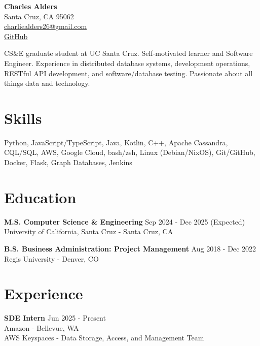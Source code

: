 \documentclass[a4paper,10pt]{article}
\begin{document}
\begin{center}
  {\LARGE \textbf{Charles Alders}} \\
  Santa Cruz, CA 95062 \\
  \href{mailto:charliealders26@gmail.com}{charliealders26@gmail.com} \\
  \href{https://github.com/char26}{GitHub}
\end{center}

\vspace{0.5cm}

\begin{flushleft}
  CS\&E graduate student at UC Santa Cruz. Self-motivated learner and Software Engineer. Experience in distributed database systems, development operations, RESTful API development, and software/database testing. Passionate about all things data and technology.
\end{flushleft}

\section*{Skills}
Python, JavaScript/TypeScript, Java, Kotlin, C++, Apache Cassandra, CQL/SQL, AWS, Google Cloud, bash/zsh, Linux (Debian/NixOS), Git/GitHub, Docker, Flask, Graph Databases, Jenkins

\section*{Education}
\begin{flushleft}
  \textbf{M.S. Computer Science \& Engineering} \hfill Sep 2024 - Dec 2025 (Expected) \\
  University of California, Santa Cruz - Santa Cruz, CA
\end{flushleft}

\begin{flushleft}
  \textbf{B.S. Business Administration: Project Management} \hfill Aug 2018 - Dec 2022 \\
  Regis University - Denver, CO
\end{flushleft}
\section*{Experience}

\begin{flushleft}
  \textbf{SDE Intern} \hfill Jun 2025 - Present \\
  Amazon - Bellevue, WA \\
  AWS Keyspaces - Data Storage, Access, and Management Team
\end{flushleft}
\end{document}
